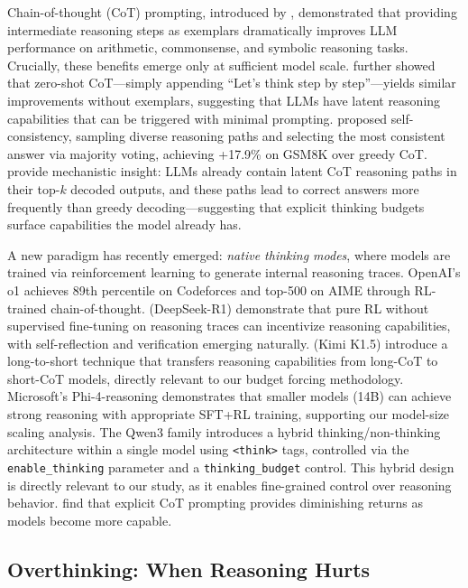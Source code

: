 \documentclass[11pt]{article}
\begin{document}
Chain-of-thought (CoT) prompting, introduced by \citet{wei2022chain}, demonstrated that providing intermediate reasoning steps as exemplars dramatically improves LLM performance on arithmetic, commonsense, and symbolic reasoning tasks. Crucially, these benefits emerge only at sufficient model scale. \citet{kojima2022large} further showed that zero-shot CoT---simply appending ``Let's think step by step''---yields similar improvements without exemplars, suggesting that LLMs have latent reasoning capabilities that can be triggered with minimal prompting. \citet{wang2023self} proposed self-consistency, sampling diverse reasoning paths and selecting the most consistent answer via majority voting, achieving +17.9\% on GSM8K over greedy CoT. \citet{wang2024cotwithout} provide mechanistic insight: LLMs already contain latent CoT reasoning paths in their top-$k$ decoded outputs, and these paths lead to correct answers more frequently than greedy decoding---suggesting that explicit thinking budgets surface capabilities the model already has.

A new paradigm has recently emerged: \emph{native thinking modes}, where models are trained via reinforcement learning to generate internal reasoning traces. OpenAI's o1 \citep{openai2024reasoning} achieves 89th percentile on Codeforces and top-500 on AIME through RL-trained chain-of-thought. \citet{deepseek2025r1} (DeepSeek-R1) demonstrate that pure RL without supervised fine-tuning on reasoning traces can incentivize reasoning capabilities, with self-reflection and verification emerging naturally. \citet{kimi2025k15} (Kimi K1.5) introduce a long-to-short technique that transfers reasoning capabilities from long-CoT to short-CoT models, directly relevant to our budget forcing methodology. Microsoft's Phi-4-reasoning \citep{microsoft2025phi4} demonstrates that smaller models (14B) can achieve strong reasoning with appropriate SFT+RL training, supporting our model-size scaling analysis. The Qwen3 family \citep{yang2025qwen3} introduces a hybrid thinking/non-thinking architecture within a single model using \texttt{<think>} tags, controlled via the \texttt{enable\_thinking} parameter and a \texttt{thinking\_budget} control. This hybrid design is directly relevant to our study, as it enables fine-grained control over reasoning behavior. \citet{meincke2025decreasing} find that explicit CoT prompting provides diminishing returns as models become more capable.

\subsection{Overthinking: When Reasoning Hurts}
\end{document}

